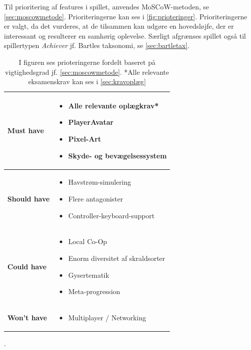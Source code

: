 Til prioritering af features i spillet, anvendes MoSCoW-metoden, se \autoref{sec:moscowmetode}. Prioriteringerne kan ses i \autoref{fig:prioteringer}. Prioriteringerne er valgt, da det vurderes, at de tilsammen kan udgøre en hovedsløjfe, der er interessant og resulterer en samhørig oplevelse. Særligt afgrænses spillet også til spillertypen \textit{Achiever} jf. Bartles taksonomi, se \autoref{sec:bartletax}.
\begin{table}[H]
  \centering
\begin{tabular}{l p{10cm}}
\toprule
\textbf{Must have} &
\vspace*{-1em}
\begin{itemize}
\item Alle relevante oplægkrav*
\item PlayerAvatar
\item Pixel-Art
\item Skyde- og bevægelsessystem
\end{itemize} \\ \midrule

\textbf{Should have} &
\vspace*{-1em}
\begin{itemize}
\item Havstrøm-simulering
\item Flere antagonister
\item Controller-keyboard-support
\end{itemize} \\ \midrule

\textbf{Could have} &
\vspace*{-1em}
\begin{itemize}
\item Local Co-Op
\item Enorm diversitet af skraldsorter
\item Gysertematik
\item Meta-progression
\end{itemize} \\ \midrule

\textbf{Won't have} &
\vspace*{-1em}
\begin{itemize}
\item Multiplayer / Networking
\end{itemize} \\ \bottomrule
\end{tabular}\caption{I figuren ses prioteringerne fordelt baseret på vigtighedsgrad jf. \autoref{sec:moscowmetode}. *Alle relevante eksamenskrav kan ses i \autoref{sec:kravoplæg}}\label{fig:prioteringer}.
\end{table}
